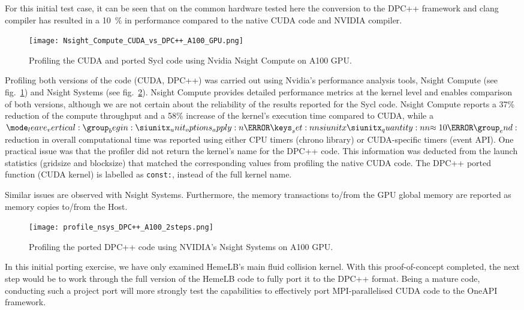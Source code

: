 \documentclass[../main]{subfiles}
\begin{document}
For this initial test case, it can be seen that on the common hardware tested here the conversion to the DPC++ framework and clang compiler has resulted in a \qty{10}{\percent} in performance compared to the native CUDA code and NVIDIA compiler.

\begin{figure}[htp]
	\centering
	\texttt{[image: Nsight\_Compute\_CUDA\_vs\_DPC++\_A100\_GPU.png]}
	\caption{Profiling the CUDA and ported Sycl code using Nvidia Nsight Compute on A100 GPU.}
	\label{fig:ncu_CUDA_Vs_DPC++_A100GPU}
\end{figure}

Profiling both versions of the code (CUDA, DPC++) was carried out using Nvidia's performance analysis tools, Nsight Compute (see fig.~\ref{fig:ncu_CUDA_Vs_DPC++_A100GPU}) and Nsight Systems (see fig.~\ref{fig:nsys_DPC++_A100GPU}).
Nsight Compute provides detailed performance metrics at the kernel level and enables comparison of both versions, although we are not certain about the reliability of the results reported for the Sycl code.
Nsight Compute reports a 37\% reduction of the compute throughput and a 58\% increase of the kernel's execution time compared to CUDA, while a $\qty{\approx10}{\percent}$ reduction in overall computational time was reported using either CPU timers (chrono library) or CUDA-specific timers (event API).
One practical issue was that the profiler did not return the kernel's name for the DPC++ code.
This information was deducted from the launch statistics (gridsize and blocksize) that matched the corresponding values from profiling the native CUDA code.
The DPC++ ported function (CUDA kernel) is labelled as \texttt{const:}, instead of the full kernel name.


Similar issues are observed with Nsight Systems.
Furthermore, the memory transactions to/from the GPU global memory are reported as memory copies to/from the Host.


\begin{figure}[htp]
	\centering
	\texttt{[image: profile\_nsys\_DPC++\_A100\_2steps.png]}
	\caption{Profiling the ported DPC++ code using NVIDIA's Nsight Systems on A100 GPU.}
	\label{fig:nsys_DPC++_A100GPU}
\end{figure}

In this initial porting exercise, we have only examined HemeLB's main fluid collision kernel.
With this proof-of-concept completed, the next step would be to work through the full version of the HemeLB code to fully port it to the DPC++ format.
Being a mature code, conducting such a project port will more strongly test the capabilities to effectively port MPI-parallelised CUDA code to the OneAPI framework.
\end{document}
